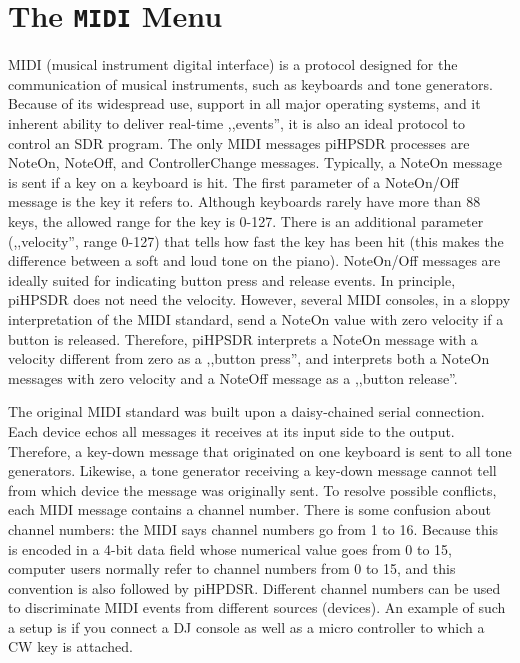 \documentclass[12pt]{book}
\def\pH{pi\-HPSDR\xspace}
\begin{document}
\section{The \texttt{MIDI} Menu}
\label{sec:midimenu}
MIDI (musical instrument digital interface) is a protocol designed for the communication of
musical instruments, such as keyboards and tone generators. Because of its widespread use,
support in all major operating systems, and it inherent ability to deliver real-time ,,events'',
it is also an ideal protocol to control an SDR program. The only MIDI messages \pH processes
are NoteOn, NoteOff, and ControllerChange messages. Typically, a NoteOn message is sent if
a key on a keyboard is hit. The first parameter of a NoteOn/Off message is the key
it refers to. Although keyboards rarely have more than 88 keys, the allowed range for
the key is 0-127. There is an additional parameter (,,velocity'', range 0-127) that tells how
fast the key has been hit (this makes the difference between a soft and loud tone on the piano).
NoteOn/Off messages are ideally suited for indicating button press and release events. In principle,
\pH does not need the velocity. However, several MIDI consoles, in a sloppy interpretation of
the MIDI standard, send a NoteOn value with zero velocity if a button is released. Therefore,
\pH interprets a NoteOn message with a velocity different from zero as a ,,button press'',
and interprets both a NoteOn messages with zero velocity and a NoteOff message as a ,,button release''.

The original MIDI standard was built upon a daisy-chained serial connection. Each device
echos all messages it receives at its input side to the output. Therefore, a key-down
message that originated on one keyboard is sent to all tone generators. Likewise, a tone
generator receiving a key-down message cannot tell from which device the message
was originally sent. To resolve possible conflicts, each MIDI message contains a channel
number. There is some confusion about channel numbers: the MIDI says channel numbers
go from 1 to 16. Because this is encoded in a 4-bit data field whose numerical value
goes from 0 to 15, computer users normally refer to channel numbers from 0 to 15,
and this convention is also followed by piHPDSR. Different channel numbers can be used
to discriminate MIDI events from different sources (devices). An example of such a setup
is if you connect a DJ console as well as a micro controller to which a CW key is attached.
\end{document}
